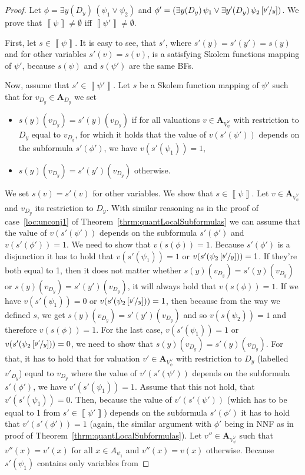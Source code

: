 \documentclass[
  digital, %
  twoside, %
  table,   %
  nolof,     %
  nolot,     %
]{fithesis3}
\theoremstyle{definition}
\theoremstyle{remark}
\newcommand{\seman}[1]{\left\llbracket {#1} \right\rrbracket}
\newcommand{\substitute}[2]{\left[ \nicefrac{#2}{#1} \right]}
\newcommand{\valtns}[1]{\mathbf{A}_{#1}}
\newcommand{\uvars}[1]{V_{#1}^{\forall}}
\newcommand{\itholds}{\,}
\begin{document}
\begin{proof}
  Let $\phi = \exists y(D_y) \itholds (\psi_1 \lor \psi_2)$ and $\phi' = (\exists y(D_y) \itholds \psi_1 \lor \exists y'(D_y) \itholds \psi_2\substitute{y}{y'})$. We prove that $\seman{\psi} \not= \emptyset$ iff $\seman{\psi'} \not= \emptyset$.
  
  First, let $s \in \seman{\psi}$. It is easy to see, that $s'$, where $s'(y) = s'(y') = s(y)$ and for other variables $s'(v) = s(v)$, is a satisfying Skolem functions mapping of $\psi'$, because $s(\psi)$ and $s(\psi')$ are the same BFs.
  
  Now, assume that $s' \in \seman{\psi'}$. Let $s$ be a Skolem function mapping of $\psi'$ such that for $v_{D_y} \in \valtns{D_y}$ we set 
  \begin{itemize}
      \item $s(y)(v_{D_y}) = s'(y)(v_{D_y})$ if for all valuations $v \in \valtns{\uvars{\psi}}$ with restriction to $D_y$ equal to $v_{D_y}$, for which it holds that the value of $v(s'(\psi'))$ depends on the subformula $s'(\phi')$, we have $v(s'(\psi_1)) = 1$,
      \item $s(y)(v_{D_y}) = s'(y')(v_{D_y})$ otherwise.
  \end{itemize}
  We set $s(v) = s'(v)$ for other variables. We show that $s \in \seman{\psi}$. Let $v \in \valtns{\uvars{\psi}}$ and $v_{D_y}$ its restriction to $D_y$. With similar reasoning as in the proof of case~\eqref{loc:unconj1} of Theorem~\ref{thrm:quantLocalSubformulas} we can assume that the value of $v(s'(\psi'))$ depends on the subformula $s'(\phi')$ and $v(s'(\phi')) = 1$. We need to show that $v(s(\phi)) = 1$. Because $s'(\phi')$ is a disjunction it has to hold that $v(s'(\psi_1)) = 1$ or $v(s'(\psi_2\substitute{y}{y'})) = 1$. If they're both equal to 1, then it does not matter whether $s(y)(v_{D_y}) = s'(y)(v_{D_y})$ or $s(y)(v_{D_y}) = s'(y')(v_{D_y})$, it will always hold that $v(s(\phi)) = 1$. If we have $v(s'(\psi_1)) = 0$ or $v(s'(\psi_2\substitute{y}{y'})) = 1$, then because from the way we defined $s$, we get $s(y)(v_{D_y}) = s'(y')(v_{D_y})$ and so $v(s(\psi_2)) = 1$ and therefore $v(s(\phi)) = 1$. For the last case, $v(s'(\psi_1)) = 1$ or $v(s'(\psi_2\substitute{y}{y'})) = 0$, we need to show that $s(y)(v_{D_y}) = s'(y)(v_{D_y})$. For that, it has to hold that for valuation $v' \in \valtns{\uvars{\psi}}$ with restriction to $D_y$ (labelled $v'_{D_y}$) equal to $v_{D_y}$ where the value of $v'(s'(\psi'))$ depends on the subformula $s'(\phi')$, we have $v'(s'(\psi_1)) = 1$. Assume that this not hold, that $v'(s'(\psi_1)) = 0$. Then, because the value of $v'(s'(\psi'))$ (which has to be equal to 1 from $s' \in \seman{\psi'}$) depends on the subformula $s'(\phi')$ it has to hold that $v'(s'(\phi')) = 1$ (again, the similar argument with $\phi'$ being in NNF as in proof of Theorem~\ref{thrm:quantLocalSubformulas}). Let $v'' \in \valtns{\uvars{\psi}}$ such that $v''(x) = v'(x)$ for all $x \in A_{\psi_1}$ and $v''(x) = v(x)$ otherwise. Because $s'(\psi_1)$ contains only variables from 
  

\end{proof}
\end{document}
